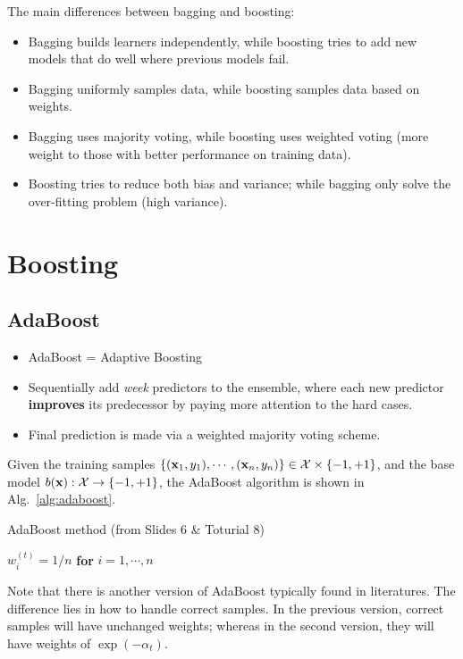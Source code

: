 \remark The main differences between bagging and boosting:
\begin{itemize}
	\item Bagging builds learners independently, while boosting tries to add new models that do well where previous models fail.
	\item Bagging uniformly samples data, while boosting samples data based on weights.
	\item Bagging uses majority voting, while boosting uses weighted voting (more weight to those with better performance on training data).
	\item Boosting tries to reduce both bias and variance; while bagging only solve the over-fitting problem (high variance).
\end{itemize}

\section{Boosting}
\subsection{AdaBoost}
\begin{itemize}
	\item AdaBoost = Adaptive Boosting
	\item Sequentially add \textit{week} predictors to the ensemble, where each new predictor \textbf{improves} its predecessor by paying more attention to the hard cases.
	\item Final prediction is made via a weighted majority voting scheme.
\end{itemize}

Given the training samples $\{(\mathbf{x}_1, y_1), \cdots , (\mathbf{x}_n, y_n)\} \in \mathcal{X} \times \{-1, +1 \} $, and the base model $b(\mathbf{x}): \mathcal{X} \rightarrow \{-1, +1 \}$, the AdaBoost algorithm is shown in Alg.~\ref{alg:adaboost}.

\begin{algorithm}[H]
\caption{AdaBoost method (from Slides 6 \& Toturial 8) \label{alg:adaboost}}
\SetAlgoLined
 $w_i^{(t)} = 1/n$ \textbf{for} $i=1,\cdots,n$\;
\end{algorithm}
Note that there is another version of AdaBoost typically found in literatures. The difference lies in how to handle correct samples. In the previous version, correct samples will have unchanged weights; whereas in the second version, they will have weights of $\exp(-\alpha_t)$.

